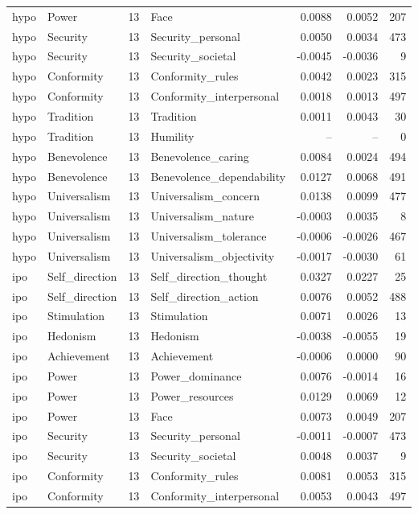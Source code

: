 \begin{tabular}{llrlrrr}
hypo & Power & 13 & Face & 0.0088 & 0.0052 & 207 \\
hypo & Security & 13 & Security\_personal & 0.0050 & 0.0034 & 473 \\
hypo & Security & 13 & Security\_societal & -0.0045 & -0.0036 & 9 \\
hypo & Conformity & 13 & Conformity\_rules & 0.0042 & 0.0023 & 315 \\
hypo & Conformity & 13 & Conformity\_interpersonal & 0.0018 & 0.0013 & 497 \\
hypo & Tradition & 13 & Tradition & 0.0011 & 0.0043 & 30 \\
hypo & Tradition & 13 & Humility & -- & -- & 0 \\
hypo & Benevolence & 13 & Benevolence\_caring & 0.0084 & 0.0024 & 494 \\
hypo & Benevolence & 13 & Benevolence\_dependability & 0.0127 & 0.0068 & 491 \\
hypo & Universalism & 13 & Universalism\_concern & 0.0138 & 0.0099 & 477 \\
hypo & Universalism & 13 & Universalism\_nature & -0.0003 & 0.0035 & 8 \\
hypo & Universalism & 13 & Universalism\_tolerance & -0.0006 & -0.0026 & 467 \\
hypo & Universalism & 13 & Universalism\_objectivity & -0.0017 & -0.0030 & 61 \\
ipo & Self\_direction & 13 & Self\_direction\_thought & 0.0327 & 0.0227 & 25 \\
ipo & Self\_direction & 13 & Self\_direction\_action & 0.0076 & 0.0052 & 488 \\
ipo & Stimulation & 13 & Stimulation & 0.0071 & 0.0026 & 13 \\
ipo & Hedonism & 13 & Hedonism & -0.0038 & -0.0055 & 19 \\
ipo & Achievement & 13 & Achievement & -0.0006 & 0.0000 & 90 \\
ipo & Power & 13 & Power\_dominance & 0.0076 & -0.0014 & 16 \\
ipo & Power & 13 & Power\_resources & 0.0129 & 0.0069 & 12 \\
ipo & Power & 13 & Face & 0.0073 & 0.0049 & 207 \\
ipo & Security & 13 & Security\_personal & -0.0011 & -0.0007 & 473 \\
ipo & Security & 13 & Security\_societal & 0.0048 & 0.0037 & 9 \\
ipo & Conformity & 13 & Conformity\_rules & 0.0081 & 0.0053 & 315 \\
ipo & Conformity & 13 & Conformity\_interpersonal & 0.0053 & 0.0043 & 497 \\

\end{tabular}
